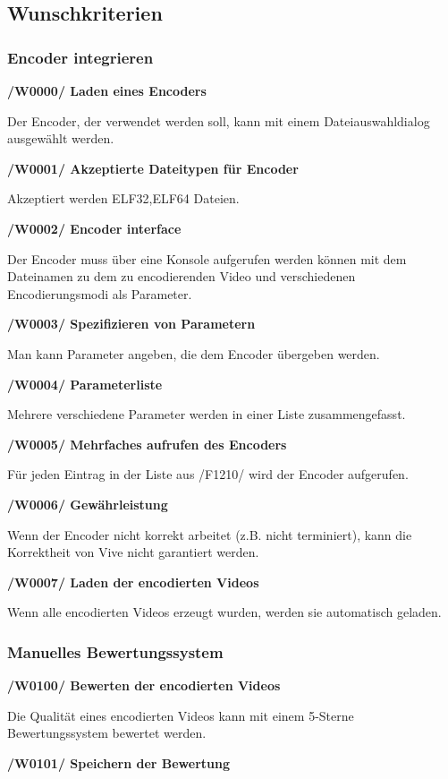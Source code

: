 \documentclass[parskip=full]{scrartcl}
\begin{document}
\subsection{Wunschkriterien}

\subsubsection{Encoder integrieren}
\textbf{/W0000/ Laden eines Encoders}

Der Encoder, der verwendet werden soll, kann mit einem Dateiauswahldialog ausgewählt werden.

\textbf{/W0001/ Akzeptierte Dateitypen für Encoder}

Akzeptiert werden ELF32,ELF64 Dateien.

\newpage
\textbf{/W0002/ Encoder interface}

Der Encoder muss über eine Konsole aufgerufen werden können mit dem Dateinamen zu dem zu encodierenden Video und verschiedenen Encodierungsmodi als Parameter.

\textbf{/W0003/ Spezifizieren von Parametern}

Man kann Parameter angeben, die dem Encoder übergeben werden.

\textbf{/W0004/ Parameterliste}

Mehrere verschiedene Parameter werden in einer Liste zusammengefasst.

\textbf{/W0005/ Mehrfaches aufrufen des Encoders}

Für jeden Eintrag in der Liste aus /F1210/ wird der Encoder aufgerufen.

\textbf{/W0006/ Gewährleistung}

Wenn der Encoder nicht korrekt arbeitet (z.B. nicht terminiert), kann die Korrektheit von Vive nicht garantiert werden.

\textbf{/W0007/ Laden der encodierten Videos}

Wenn alle encodierten Videos erzeugt wurden, werden sie automatisch geladen.

\subsubsection{Manuelles Bewertungssystem}
\textbf{/W0100/ Bewerten der encodierten Videos}

Die Qualität eines encodierten Videos kann mit einem 5-Sterne Bewertungssystem bewertet werden.

\textbf{/W0101/ Speichern der Bewertung}
\end{document}
